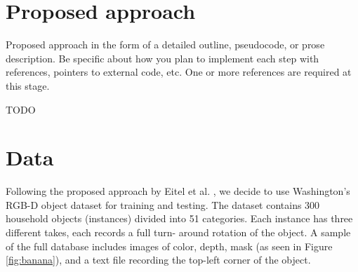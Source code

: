 \documentclass[paper=letter, fontsize=12pt]{article}
\begin{document}
\section{Proposed approach}

Proposed approach in the form of a detailed outline, pseudocode, or prose description. Be specific about how you plan to implement each step with references, pointers to external code, etc. One or more references are required at this stage.

TODO



\section{Data}

Following the proposed approach by Eitel et al. \cite{Eitel2015}, we decide to
use Washington's RGB-D object dataset \cite{Lai2011} for training and testing.
The dataset contains 300 household objects (instances) divided into 51
categories. Each instance has three different takes, each records a full turn-
around rotation of the object. A sample of the full database includes images of
color, depth, mask (as seen in Figure \ref{fig:banana}), and a text file
recording the top-left corner of the object.
\end{document}
